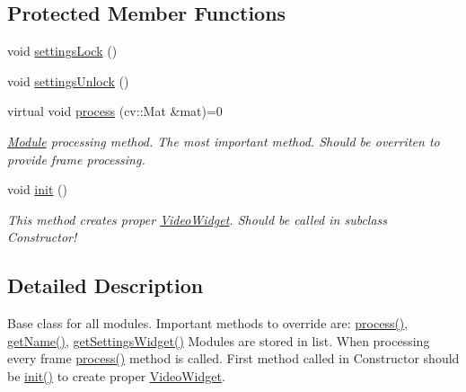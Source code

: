 \subsection*{Protected Member Functions}
\begin{DoxyCompactItemize}
\item 
void \hyperlink{class_module_a56495f4dcfb3fc0a77178ba47a5414c9}{settingsLock} ()
\item 
void \hyperlink{class_module_a1834931d5ddcdc84d9289661aaf0cece}{settingsUnlock} ()
\item 
virtual void \hyperlink{class_module_a5105981c562627043d38527dc31124c8}{process} (cv::Mat \&mat)=0
\begin{DoxyCompactList}\small\item\em \hyperlink{class_module}{Module} processing method. The most important method. Should be overriten to provide frame processing. \item\end{DoxyCompactList}\item 
\hypertarget{class_module_ad1956ac81429ec1f61f83dbc081cf18c}{
void \hyperlink{class_module_ad1956ac81429ec1f61f83dbc081cf18c}{init} ()}
\label{dd/df9/class_module_ad1956ac81429ec1f61f83dbc081cf18c}

\begin{DoxyCompactList}\small\item\em This method creates proper \hyperlink{class_video_widget}{VideoWidget}. Should be called in subclass Constructor! \item\end{DoxyCompactList}\end{DoxyCompactItemize}


\subsection{Detailed Description}
Base class for all modules. Important methods to override are: \hyperlink{class_module_a5105981c562627043d38527dc31124c8}{process()}, \hyperlink{class_module_a1cf07480fdd9a964eb8375bf2fb549b0}{getName()}, \hyperlink{class_module_a7a6a83882ef0d9aec623577884ce2fb5}{getSettingsWidget()} Modules are stored in list. When processing every frame \hyperlink{class_module_a5105981c562627043d38527dc31124c8}{process()} method is called. First method called in Constructor should be \hyperlink{class_module_ad1956ac81429ec1f61f83dbc081cf18c}{init()} to create proper \hyperlink{class_video_widget}{VideoWidget}. 

